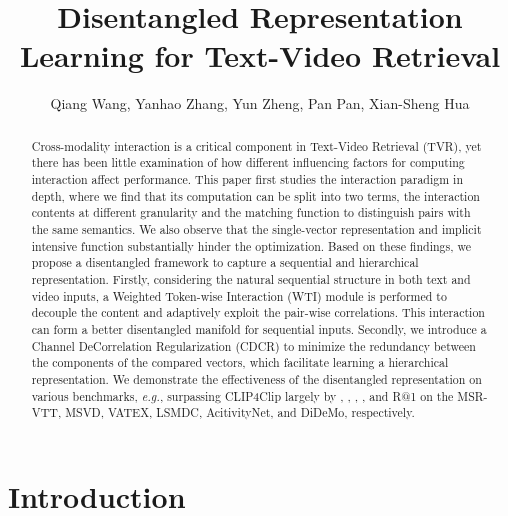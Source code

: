 \documentclass[runningheads]{llncs}
\begin{document}
\pagestyle{headings}
\mainmatter
\def\ECCVSubNumber{3550}  

\title{Disentangled Representation Learning for Text-Video Retrieval} 




\author{Qiang Wang, Yanhao Zhang, Yun Zheng, Pan Pan, Xian-Sheng Hua\\
}
\maketitle

\begin{abstract}
Cross-modality interaction is a critical component in Text-Video Retrieval (TVR), yet there has been little examination of how different influencing factors for computing interaction affect performance.
This paper first studies the interaction paradigm in depth, where we find that its computation can be split into two terms, the interaction contents at different granularity and the matching function to distinguish pairs with the same semantics.
We also observe that the single-vector representation and implicit intensive function substantially hinder the optimization.
Based on these findings, we propose a disentangled framework to capture a sequential and hierarchical representation. 
Firstly, considering the natural sequential structure in both text and video inputs, a Weighted Token-wise Interaction (WTI) module is performed to decouple the content and adaptively exploit the pair-wise correlations.
This interaction can form a better disentangled manifold for sequential inputs.
Secondly, we introduce a Channel DeCorrelation Regularization (CDCR) to minimize the redundancy between the components of the compared vectors, which facilitate learning a hierarchical representation.
We demonstrate the effectiveness of the disentangled representation on various benchmarks, \textit{e.g.}, surpassing CLIP4Clip largely by , , , ,  and  R@1 on the MSR-VTT, MSVD, VATEX, LSMDC, AcitivityNet, and DiDeMo, respectively.

\end{abstract} 
\section{Introduction}
\end{document}

